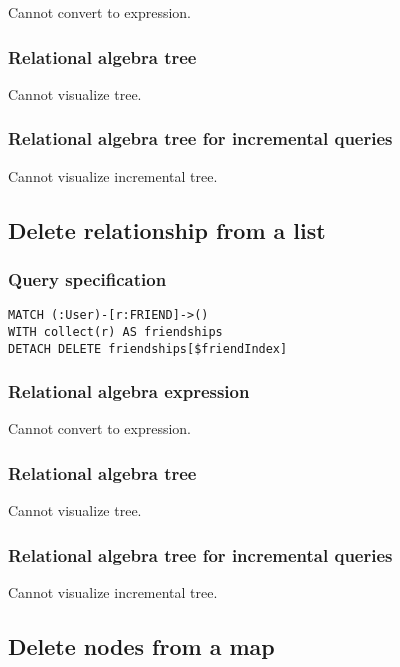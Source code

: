 Cannot convert to expression.

\subsubsection*{Relational algebra tree}

Cannot visualize tree.

\subsubsection*{Relational algebra tree for incremental queries}

Cannot visualize incremental tree.

\subsection{Delete relationship from a list}

\subsubsection*{Query specification}

\begin{lstlisting}
MATCH (:User)-[r:FRIEND]->()
WITH collect(r) AS friendships
DETACH DELETE friendships[$friendIndex]
\end{lstlisting}

\subsubsection*{Relational algebra expression}

Cannot convert to expression.

\subsubsection*{Relational algebra tree}

Cannot visualize tree.

\subsubsection*{Relational algebra tree for incremental queries}

Cannot visualize incremental tree.

\subsection{Delete nodes from a map}

